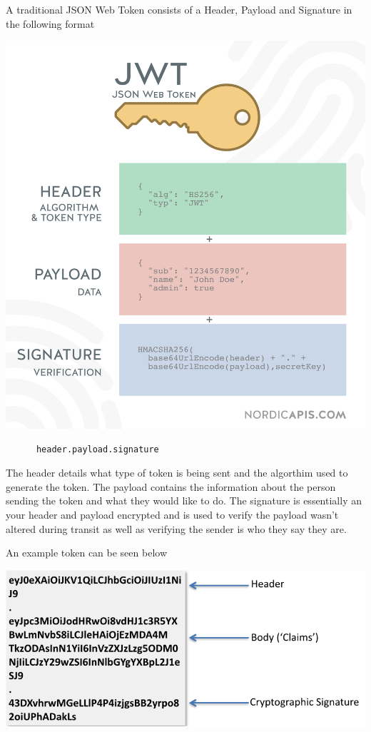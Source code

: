     A traditional JSON Web Token consists of a Header, Payload and Signature in the following format 
    
    \begin{center}    
      \includegraphics{img/JWTTokens.png}
    \end{center}

    \begin{verbatim}
      header.payload.signature
    \end{verbatim}

    The header details what type of token is being sent and the algorthim used to generate the token.
    The payload contains the information about the person sending the token and what they would like to do.
    The signature is essentially an your header and payload encrypted and is used to verify the payload wasn't altered during transit as well as verifying the sender is who they say they are.
    
    An example token can be seen below

    \begin{center}    
      \includegraphics{img/JWTTokenHASH.png}
    \end{center}

